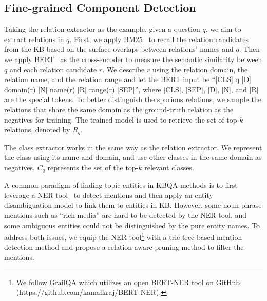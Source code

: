 
\subsection{Fine-grained Component Detection}
\label{sec:fine_grained}
Taking the relation extractor as the example, given a question $q$, we aim to extract relations in $q$. First, we apply BM25~\cite{robertson2009probabilistic} to recall the relation candidates from the KB based on the surface overlaps between relations' names and $q$. 
Then we apply BERT~\cite{devlin2018bert} as the cross-encoder to measure the semantic similarity between $q$ and each relation candidate $r$. 
We describe $r$ using the relation domain, the relation name, and the relation range and let the BERT input be ``[CLS] q [D] domain(r) [N] name(r) [R] range(r) [SEP]'', where [CLS], [SEP], [D], [N], and [R] are the special tokens. 
To better distinguish the spurious relations, we sample the relations that share the same domain as the ground-truth relation as the negatives for training.
The trained model is used to retrieve the set of top-$k$ relations, denoted by $R_q$.

The class extractor works in the same way as the relation extractor. We represent the class using its name and domain, and use other classes in the same domain as negatives. $C_q$ represents the set of the top-$k$ relevant classes.

A common paradigm of finding topic entities in KBQA methods is to first leverage a NER tool~\cite{finkel2005incorporating} to detect mentions and then apply an entity disambiguation model to link them to entities in KB. However, some noun-phrase mentions such as ``rich media'' are hard to be detected by the NER tool, and some ambiguous entities could not be distinguished by the pure entity names.  To address both issues, we equip the NER tool\footnote{We follow GrailQA which utilizes an open BERT-NER tool on GitHub (https://github.com/kamalkraj/BERT-NER).} with a trie tree-based mention detection method and propose a relation-aware pruning method to filter the mentions.

